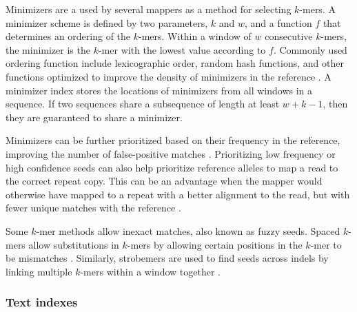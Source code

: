 \documentclass[11pt]{ucscthesis}
\begin{document}
Minimizers are a used by several mappers as a method for selecting $k$-mers.
A minimizer scheme is defined by two parameters, $k$ and $w$, and a function $f$ that determines an ordering of the $k$-mers.
Within a window of $w$ consecutive $k$-mers, the minimizer is the $k$-mer with the lowest value according to $f$.
Commonly used ordering function include lexicographic order, random hash functions, and other functions optimized to improve the density of minimizers in the reference \cite{zheng_minimizers_2020,marcais_minimizers_2018}.
A minimizer index stores the locations of minimizers from all windows in a sequence.
If two sequences share a subsequence of length at least $w+k-1$, then they are guaranteed to share a minimizer.

Minimizers can be further prioritized based on their frequency in the reference, improving the number of false-positive matches \cite{jain_winnowmap_2020}.
Prioritizing low frequency or high confidence seeds can also help prioritize reference alleles to map a read to the correct repeat copy. 
This can be an advantage when the mapper would otherwise have mapped to a repeat with a better alignment to the read, but with fewer unique matches with the reference \cite{winnowmap2_2022}.

Some $k$-mer methods allow inexact matches, also known as fuzzy seeds.
Spaced $k$-mers allow substitutions in $k$-mers by allowing certain positions in the $k$-mer to be mismatches \cite{ma_patternhunter_2002}.
Similarly, strobemers are used to find seeds across indels by linking multiple $k$-mers within a window together \cite{sahlin_strobemers_2021}.



\subsubsection{Text indexes}
\end{document}
